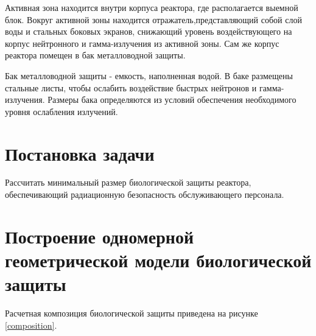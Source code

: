 Активная зона находится внутри корпуса реактора, где располагается выемной блок. Вокруг активной зоны находится отражатель,представляющий собой слой воды и стальных боковых экранов, снижающий уровень воздействующего на корпус нейтронного и гамма-излучения из активной зоны. Сам же корпус реактора помещен в бак металловодной защиты.

Бак металловодной защиты - емкость, наполненная водой. В баке размещены стальные листы, чтобы ослабить воздействие быстрых нейтронов и гамма-излучения. Размеры бака определяются из условий обеспечения необходимого уровня ослабления излучений. 

\section{Постановка задачи}
Рассчитать минимальный размер биологической защиты реактора, обеспечивающий радиационную безопасность обслуживающего персонала.

\section{Построение одномерной геометрической модели биологической защиты}

Расчетная композиция биологической защиты приведена на рисунке \ref{composition}.

